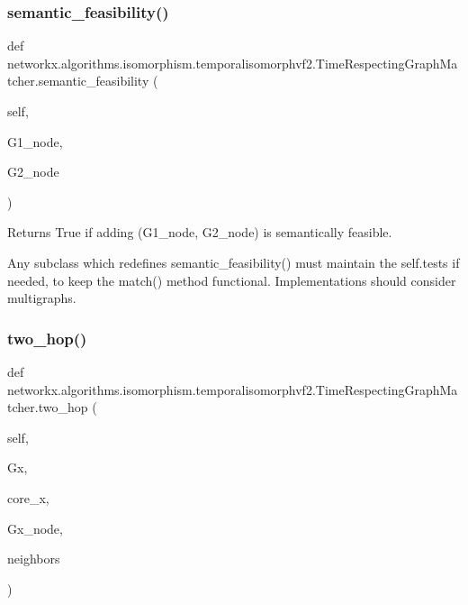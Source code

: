 \subsubsection{\texorpdfstring{semantic\+\_\+feasibility()}{semantic\_feasibility()}}
{\footnotesize\ttfamily def networkx.\+algorithms.\+isomorphism.\+temporalisomorphvf2.\+Time\+Respecting\+Graph\+Matcher.\+semantic\+\_\+feasibility (\begin{DoxyParamCaption}\item[{}]{self,  }\item[{}]{G1\+\_\+node,  }\item[{}]{G2\+\_\+node }\end{DoxyParamCaption})}

\begin{DoxyVerb}Returns True if adding (G1_node, G2_node) is semantically
feasible.

Any subclass which redefines semantic_feasibility() must
maintain the self.tests if needed, to keep the match() method
functional. Implementations should consider multigraphs.
\end{DoxyVerb}
 \mbox{\label{classnetworkx_1_1algorithms_1_1isomorphism_1_1temporalisomorphvf2_1_1TimeRespectingGraphMatcher_ae3e70667b056fc228408dd3ad96390d2}} 
\subsubsection{\texorpdfstring{two\+\_\+hop()}{two\_hop()}}
{\footnotesize\ttfamily def networkx.\+algorithms.\+isomorphism.\+temporalisomorphvf2.\+Time\+Respecting\+Graph\+Matcher.\+two\+\_\+hop (\begin{DoxyParamCaption}\item[{}]{self,  }\item[{}]{Gx,  }\item[{}]{core\+\_\+x,  }\item[{}]{Gx\+\_\+node,  }\item[{}]{neighbors }\end{DoxyParamCaption})}

